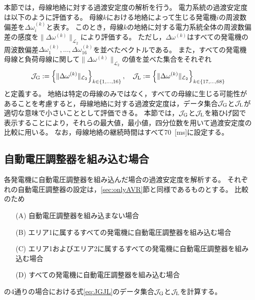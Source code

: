 \documentclass[tombow,dvipdfmx]{corona-a5-1.1}
\begin{document}
本節では，母線地絡に対する過渡安定度の解析を行う。
電力系統の過渡安定度は以下のように評価する。
母線$k$における地絡によって生じる発電機$i$の周波数偏差を$\Delta \omega_i^{(k)}$と表す。
このとき，母線$k$の地絡に対する電力系統全体の周波数偏差の感度を$\|\Delta \omega^{(k)}\|_{\mathcal{L}_2}$により評価する。
ただし，$\Delta \omega^{(k)}$はすべての発電機の周波数偏差$\Delta \omega_1^{(k)},\ldots,\Delta \omega_{16}^{(k)}$を並べたベクトルである。
また，すべての発電機母線と負荷母線に関して$\|\Delta \omega^{(k)}\|_{\mathcal{L}_2}$の値を並べた集合をそれぞれ
\begin{align}\label{eq:JGJL}
\mathcal{J}_{\rm G}:=
\left\{
\| \Delta \omega^{(k)} \|_{\mathcal{L}_2}
\right\}_{k\in \{1,\ldots,16\} }
,\quad
\mathcal{J}_{\rm L}
:=
\left\{
\| \Delta \omega^{(k)} \|_{\mathcal{L}_2}
\right\}_{k\in \{17,\ldots,68\} }
\end{align}
と定義する。
地絡は特定の母線のみではなく，すべての母線に生じる可能性があることを考慮すると，母線地絡に対する過渡安定度は，データ集合$\mathcal{J}_{\rm G}$と$\mathcal{J}_{\rm L}$が適切な意味で小さいこととして評価できる。
本節では，$\mathcal{J}_{\rm G}$と$\mathcal{J}_{\rm L}$を箱ひげ図で表示することにより，それらの最大値，最小値，四分位数を用いて過渡安定度の比較に用いる。
なお，母線地絡の継続時間はすべて70~[ms]に設定する。


\subsection{自動電圧調整器を組み込む場合}

各発電機に自動電圧調整器を組み込んだ場合の過渡安定度を解析する。
それぞれの自動電圧調整器の設定は，\ref{sec:onlyAVR}節と同様であるものとする。
比較のため
\begin{itemize}
\item[(A)] 自動電圧調整器を組み込まない場合
\item[(B)] エリア1に属するすべての発電機に自動電圧調整器を組み込む場合
\item[(C)] エリア1およびエリア2に属するすべての発電機に自動電圧調整器を組み込む場合
\item[(D)] すべての発電機に自動電圧調整器を組み込む場合
\end{itemize}
の4通りの場合における式\ref{eq:JGJL}のデータ集合$\mathcal{J}_{\rm G}$と$\mathcal{J}_{\rm L}$を計算する。
\end{document}
